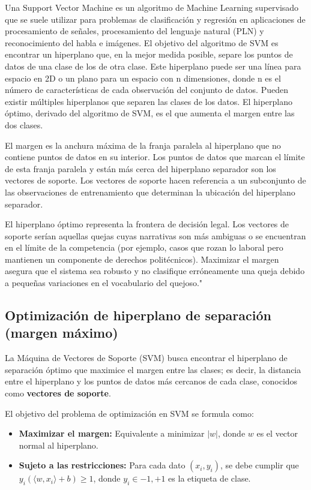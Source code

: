 Una Support Vector Machine es un algoritmo de Machine Learning supervisado que se suele utilizar para problemas de clasificación y regresión en aplicaciones de procesamiento de señales, procesamiento del lenguaje natural (PLN) y reconocimiento del habla e imágenes. El objetivo del algoritmo de SVM es encontrar un hiperplano que, en la mejor medida posible, separe los puntos de datos de una clase de los de otra clase. Este hiperplano puede ser una línea para espacio en 2D o un plano para un espacio con n dimensiones, donde n es el número de características de cada observación del conjunto de datos. Pueden existir múltiples hiperplanos que separen las clases de los datos. El hiperplano óptimo, derivado del algoritmo de SVM, es el que aumenta el margen entre las dos clases.

El margen es la anchura máxima de la franja paralela al hiperplano que no contiene puntos de datos en su interior. Los puntos de datos que marcan el límite de esta franja paralela y están más cerca del hiperplano separador son los vectores de soporte. Los vectores de soporte hacen referencia a un subconjunto de las observaciones de entrenamiento que determinan la ubicación del hiperplano separador.

El hiperplano óptimo representa la frontera de decisión legal. Los vectores de soporte serían aquellas quejas cuyas narrativas son más ambiguas o se encuentran en el límite de la competencia (por ejemplo, casos que rozan lo laboral pero mantienen un componente de derechos politécnicos). Maximizar el margen asegura que el sistema sea robusto y no clasifique erróneamente una queja debido a pequeñas variaciones en el vocabulario del quejoso."

\subsection{Optimización de hiperplano de separación (margen máximo)}

La Máquina de Vectores de Soporte (SVM) busca encontrar el hiperplano de separación óptimo que maximice el margen entre las clases; es decir, la distancia entre el hiperplano y los puntos de datos más cercanos de cada clase, conocidos como \textbf{vectores de soporte}.

El objetivo del problema de optimización en SVM se formula como:

\begin{itemize}
\item \textbf{Maximizar el margen:} Equivalente a minimizar $|w|$, donde $w$ es el vector normal al hiperplano.
\item \textbf{Sujeto a las restricciones:} Para cada dato $(x_i, y_i)$, se debe cumplir que $y_i(\langle w, x_i \rangle + b) \geq 1$, donde $y_i \in {-1, +1}$ es la etiqueta de clase.
\end{itemize}

